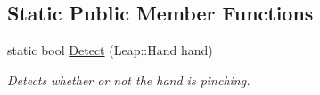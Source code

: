 \subsection*{Static Public Member Functions}
\begin{DoxyCompactItemize}
\item 
static bool \hyperlink{class_efficio_1_1_input_recognition_1_1_human_1_1_hand_1_1_pinch_acf53bfa1ea2e7763fa98f99ebe0474e5}{Detect} (Leap\+::\+Hand hand)\hypertarget{class_efficio_1_1_input_recognition_1_1_human_1_1_hand_1_1_pinch_acf53bfa1ea2e7763fa98f99ebe0474e5}{}\label{class_efficio_1_1_input_recognition_1_1_human_1_1_hand_1_1_pinch_acf53bfa1ea2e7763fa98f99ebe0474e5}

\begin{DoxyCompactList}\small\item\em Detects whether or not the hand is pinching. \end{DoxyCompactList}\end{DoxyCompactItemize}
